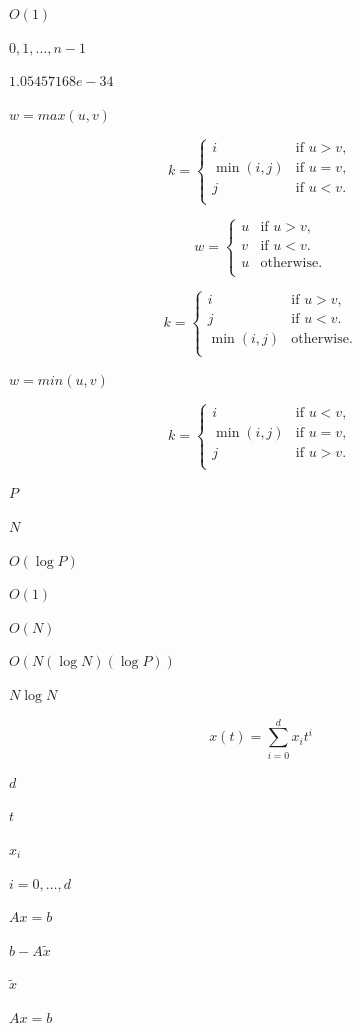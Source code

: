 \documentclass{article}
\begin{document}
$ O(1)$
\pagebreak

$0, 1, \dots, n-1$
\pagebreak

$1.05457168e-34$
\pagebreak

$w =
max(u,v)$
\pagebreak

\[  k = \begin{cases}
    i         & \text{if $u > v$}, \\
    \min(i,j) & \text{if $u = v$}, \\
    j         & \text{if $u < v$}. \\
\end{cases}
\]
\pagebreak

\[  w = \begin{cases}
    u     & \text{if $u > v$}, \\
    v     & \text{if $u < v$}. \\
    u     & \text{otherwise}. \\
  \end{cases}
\]
\pagebreak

\[  k = \begin{cases}
    i         & \text{if $u > v$}, \\
    j         & \text{if $u < v$}. \\
    \min(i,j) & \text{otherwise}. \\
  \end{cases}
\]
\pagebreak

$w =
min(u,v)$
\pagebreak

\[  k = \begin{cases}
    i         & \text{if $u < v$}, \\
    \min(i,j) & \text{if $u = v$}, \\
    j         & \text{if $u > v$}. \\
  \end{cases}
\]
\pagebreak

$P$
\pagebreak

$N$
\pagebreak

$O(\log P)$
\pagebreak

$O(1)$
\pagebreak

$O(N)$
\pagebreak

$O(N (\log N) (\log P))$
\pagebreak

$N \log N$
\pagebreak

\[    x(t) = \sum_{i=0}^d x_i t^i
\]
\pagebreak

$d$
\pagebreak

$t$
\pagebreak

$x_i$
\pagebreak

$i=0,\dots,d$
\pagebreak

$Ax=b$
\pagebreak

$b - A \tilde{x}$
\pagebreak

$\tilde{x}$
\pagebreak

$Ax = b$
\pagebreak
\end{document}
